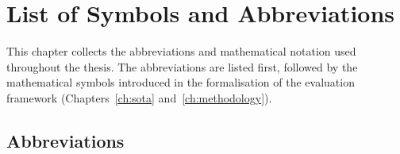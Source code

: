 \chapter{List of Symbols and Abbreviations}
\label{ch:symbols}

This chapter collects the abbreviations and mathematical notation used
throughout the thesis. The abbreviations are listed first, followed by the
mathematical symbols introduced in the formalisation of the evaluation
framework (Chapters~\ref{ch:sota} and~\ref{ch:methodology}).

\section*{Abbreviations}

